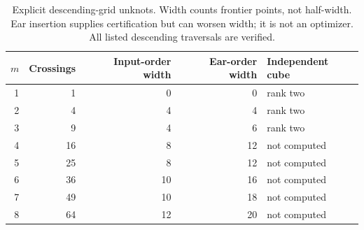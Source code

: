 \begin{table}[htbp]
\centering\small
\begin{tabular}{@{}rrrrl@{}}\toprule
$m$ & Crossings & Input-order width & Ear-order width & Independent cube\\\midrule
1 & 1 & 0 & 0 & rank two\\
2 & 4 & 4 & 4 & rank two\\
3 & 9 & 4 & 6 & rank two\\
4 & 16 & 8 & 12 & not computed\\
5 & 25 & 8 & 12 & not computed\\
6 & 36 & 10 & 16 & not computed\\
7 & 49 & 10 & 18 & not computed\\
8 & 64 & 12 & 20 & not computed\\
\bottomrule\end{tabular}
\caption{Explicit descending-grid unknots. Width counts frontier points, not half-width. Ear insertion supplies certification but can worsen width; it is not an optimizer. All listed descending traversals are verified.}
\label{tab:grid}
\end{table}
